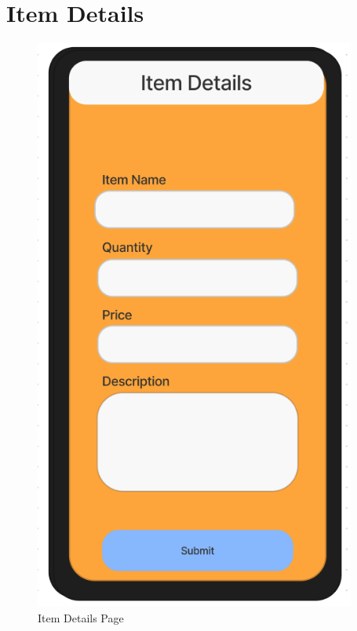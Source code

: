 \documentclass[title page]{article}
\begin{document}
\section{Item Details}
\begin{figure}[!h]
    \begin{center}
          \includegraphics[height=19cm]{images/item.png}
          \caption{Item Details Page}
          \label{fig:itemdetails}
    \end{center}
\end{figure}
\end{document}
